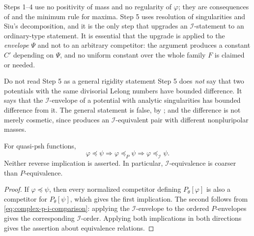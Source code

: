 \begin{remark}
\label{rem:ch51-i-projection-hypotheses}
Steps 1--4 use no positivity of mass and no regularity of \(\varphi\);
they are consequences of  and the
minimum rule for maxima.  Step 5 uses resolution of singularities and
Siu's decomposition, and it is the only step that upgrades an
\(\mathcal I\)-statement to an ordinary-type statement.  It is essential
that the upgrade is applied to the \emph{envelope} \(\Psi\) and not to an
arbitrary competitor: the argument produces a constant \(C'\) depending
on \(\Psi\), and no uniform constant over the whole family \(F\) is
claimed or needed.
\end{remark}

\begin{warning}{Do not read Step 5 as a general rigidity statement}
\label{warn:ch51-step5}
Step 5 does \emph{not} say that two potentials with the same divisorial
Lelong numbers have bounded difference.  It says that the
\(\mathcal I\)-envelope of a potential with analytic singularities has
bounded difference from it.  The general statement is false, by
; and the difference is not merely
cosmetic, since  produces an
\(\mathcal I\)-equivalent pair with different nonpluripolar masses.
\end{warning}

\begin{corollary}\label{cor:complex-comparison-hierarchy}
For quasi-psh functions,
\[
 \varphi\preceq\psi
 \Longrightarrow
 \varphi\preceq_P\psi
 \Longrightarrow
 \varphi\preceq_{\mathcal I}\psi.
\tag{51.32}\label{eq:complex-comparison-hierarchy}
\]
Neither reverse implication is asserted.  In particular,
\(\mathcal I\)-equivalence is coarser than \(P\)-equivalence.
\end{corollary}

\begin{proof}
If \(\varphi\preceq\psi\), then every normalized competitor defining
\(P_\theta[\varphi]\) is also a competitor for \(P_\theta[\psi]\), which
gives the first implication.  The second follows from
\eqref{eq:complex-p-i-comparison}: applying the \(\mathcal I\)-envelope
to the ordered \(P\)-envelopes gives the corresponding
\(\mathcal I\)-order.  Applying both implications in both directions
gives the assertion about equivalence relations.
\end{proof}

